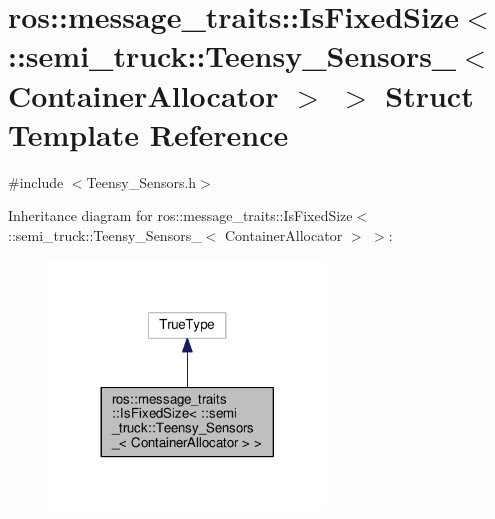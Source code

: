 \hypertarget{structros_1_1message__traits_1_1_is_fixed_size_3_01_1_1semi__truck_1_1_teensy___sensors___3_01_container_allocator_01_4_01_4}{}\section{ros\+:\+:message\+\_\+traits\+:\+:Is\+Fixed\+Size$<$ \+:\+:semi\+\_\+truck\+:\+:Teensy\+\_\+\+Sensors\+\_\+$<$ Container\+Allocator $>$ $>$ Struct Template Reference}
\label{structros_1_1message__traits_1_1_is_fixed_size_3_01_1_1semi__truck_1_1_teensy___sensors___3_01_container_allocator_01_4_01_4}


{\ttfamily \#include $<$Teensy\+\_\+\+Sensors.\+h$>$}



Inheritance diagram for ros\+:\+:message\+\_\+traits\+:\+:Is\+Fixed\+Size$<$ \+:\+:semi\+\_\+truck\+:\+:Teensy\+\_\+\+Sensors\+\_\+$<$ Container\+Allocator $>$ $>$\+:\nopagebreak
\begin{figure}[H]
\begin{center}
\leavevmode
\includegraphics[width=209pt]{structros_1_1message__traits_1_1_is_fixed_size_3_01_1_1semi__truck_1_1_teensy___sensors___3_01_ca610f05107398a23779c2cf5a2710d4f}
\end{center}
\end{figure}


